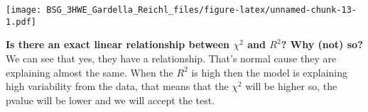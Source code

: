 \documentclass[]{article}
\newenvironment{Shaded}{\begin{snugshade}}{\end{snugshade}}
\newcommand{\KeywordTok}[1]{\textcolor[rgb]{0.13,0.29,0.53}{\textbf{#1}}}
\newcommand{\DataTypeTok}[1]{\textcolor[rgb]{0.13,0.29,0.53}{#1}}
\newcommand{\DecValTok}[1]{\textcolor[rgb]{0.00,0.00,0.81}{#1}}
\newcommand{\StringTok}[1]{\textcolor[rgb]{0.31,0.60,0.02}{#1}}
\newcommand{\OtherTok}[1]{\textcolor[rgb]{0.56,0.35,0.01}{#1}}
\newcommand{\ControlFlowTok}[1]{\textcolor[rgb]{0.13,0.29,0.53}{\textbf{#1}}}
\newcommand{\OperatorTok}[1]{\textcolor[rgb]{0.81,0.36,0.00}{\textbf{#1}}}
\newcommand{\NormalTok}[1]{#1}
\begin{document}
\begin{Shaded}
\end{Shaded}

\begin{Shaded}
\end{Shaded}

\texttt{[image: BSG\_3HWE\_Gardella\_Reichl\_files/figure-latex/unnamed-chunk-13-1.pdf]}

\textbf{Is there an exact linear relationship between \(\chi^2\) and
\(R^2\)? Why (not) so?}\\
We can see that yes, they have a relationship. That's normal cause they
are explaining almost the same. When the \(R^2\) is high then the model
is explaining high variability from the data, that means that the
\(\chi^2\) will be higher so, the pvalue will be lower and we will
accept the test.
\end{document}
